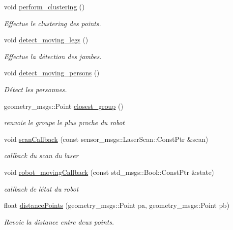 \begin{DoxyCompactItemize}
void \hyperlink{classmoving__persons__detector_a985ef636f8e95332f1559681aff3414f}{perform\+\_\+clustering} ()
\begin{DoxyCompactList}\small\item\em Effectue le clustering des points. \end{DoxyCompactList}\item 
void \hyperlink{classmoving__persons__detector_ab84737ca7963b67f6aa8a9b9bf4322b0}{detect\+\_\+moving\+\_\+legs} ()
\begin{DoxyCompactList}\small\item\em Effectue la détection des jambes. \end{DoxyCompactList}\item 
void \hyperlink{classmoving__persons__detector_af1519f7b134ebe1742d4837b675f0810}{detect\+\_\+moving\+\_\+persons} ()
\begin{DoxyCompactList}\small\item\em Détect les personnes. \end{DoxyCompactList}\item 
geometry\+\_\+msgs\+::\+Point \hyperlink{classmoving__persons__detector_a56e54848546290d3dd0c06956763ee30}{closest\+\_\+group} ()
\begin{DoxyCompactList}\small\item\em renvoie le groupe le plus proche du robot \end{DoxyCompactList}\item 
void \hyperlink{classmoving__persons__detector_af5443988d657ef8a8491a31e5e8ec9fa}{scan\+Callback} (const sensor\+\_\+msgs\+::\+Laser\+Scan\+::\+Const\+Ptr \&scan)
\begin{DoxyCompactList}\small\item\em callback du scan du laser \end{DoxyCompactList}\item 
void \hyperlink{classmoving__persons__detector_adc5abaf5a29ad580e32491549e4cf784}{robot\+\_\+moving\+Callback} (const std\+\_\+msgs\+::\+Bool\+::\+Const\+Ptr \&state)
\begin{DoxyCompactList}\small\item\em callback de l\textquotesingle{}état du robot \end{DoxyCompactList}\item 
float \hyperlink{classmoving__persons__detector_a2724a72050ae34ba6d1a2804941d9758}{distance\+Points} (geometry\+\_\+msgs\+::\+Point pa, geometry\+\_\+msgs\+::\+Point pb)
\begin{DoxyCompactList}\small\item\em Revoie la distance entre deux points. \end{DoxyCompactList}\item 

\end{DoxyCompactItemize}
